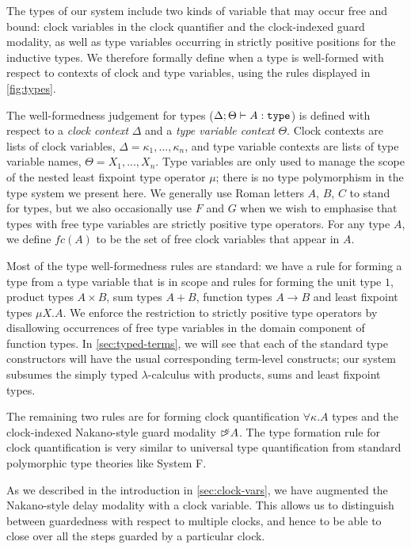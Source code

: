 The types of our system include two kinds of variable that may occur
free and bound: clock variables in the clock quantifier and the
clock-indexed guard modality, as well as type variables occurring in
strictly positive positions for the inductive types. We therefore
formally define when a type is well-formed with respect to contexts of
clock and type variables, using the rules displayed in
\autoref{fig:types}.

The well-formedness judgement for types ($\Delta; \Theta \vdash A :
\texttt{\textup{type}}$) is defined with respect to a \emph{clock context} $\Delta$
and a \emph{type variable context} $\Theta$. Clock contexts are lists
of clock variables, $\Delta = \kappa_1, ..., \kappa_n$, and type
variable contexts are lists of type variable names, $\Theta = X_1,
..., X_n$. Type variables are only used to manage the scope of the
nested least fixpoint type operator $\mu$; there is no type
polymorphism in the type system we present here. We generally use
Roman letters $A$, $B$, $C$ to stand for types, but we also
occasionally use $F$ and $G$ when we wish to emphasise that types with
free type variables are strictly positive type operators. For any type
$A$, we define $\mathit{fc}(A)$ to be the set of free clock variables
that appear in $A$.

Most of the type well-formedness rules are standard: we have a rule
for forming a type from a type variable that is in scope and rules for
forming the unit type $1$, product types $A \times B$, sum types $A +
B$, function types $A \to B$ and least fixpoint types $\mu X. A$. We
enforce the restriction to strictly positive type operators by
disallowing occurrences of free type variables in the domain component
of function types. In \autoref{sec:typed-terms}, we will see that each
of the standard type constructors will have the usual corresponding
term-level constructs; our system subsumes the simply typed
$\lambda$-calculus with products, sums and least fixpoint types.

The remaining two rules are for forming clock quantification $\forall
\kappa.A$ types and the clock-indexed Nakano-style guard modality
$\mathord{\rhd\kern-0.4em^{\kappa}} A$. The type formation rule for clock quantification is
very similar to universal type quantification from standard
polymorphic type theories like System F. 

As we described in the introduction in \autoref{sec:clock-vars}, we
have augmented the Nakano-style delay modality with a clock
variable. This allows us to distinguish between guardedness with
respect to multiple clocks, and hence to be able to close over all the
steps guarded by a particular clock.

